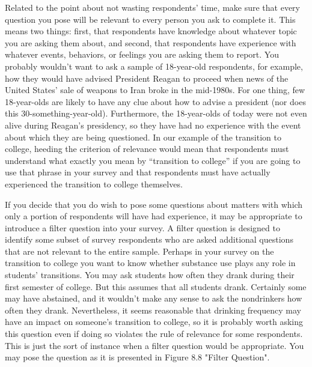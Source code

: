 Related to the point about not wasting respondents’ time, make sure that every question you pose will be relevant to every person you ask to complete it. This means two things: first, that respondents have knowledge about whatever topic you are asking them about, and second, that respondents have experience with whatever events, behaviors, or feelings you are asking them to report. You probably wouldn’t want to ask a sample of 18-year-old respondents, for example, how they would have advised President Reagan to proceed when news of the United States’ sale of weapons to Iran broke in the mid-1980s. For one thing, few 18-year-olds are likely to have any clue about how to advise a president (nor does this 30-something-year-old). Furthermore, the 18-year-olds of today were not even alive during Reagan’s presidency, so they have had no experience with the event about which they are being questioned. In our example of the transition to college, heeding the criterion of relevance would mean that respondents must understand what exactly you mean by “transition to college” if you are going to use that phrase in your survey and that respondents must have actually experienced the transition to college themselves.

If you decide that you do wish to pose some questions about matters with which only a portion of respondents will have had experience, it may be appropriate to introduce a filter question into your survey. A filter question is designed to identify some subset of survey respondents who are asked additional questions that are not relevant to the entire sample. Perhaps in your survey on the transition to college you want to know whether substance use plays any role in students’ transitions. You may ask students how often they drank during their first semester of college. But this assumes that all students drank. Certainly some may have abstained, and it wouldn’t make any sense to ask the nondrinkers how often they drank. Nevertheless, it seems reasonable that drinking frequency may have an impact on someone’s transition to college, so it is probably worth asking this question even if doing so violates the rule of relevance for some respondents. This is just the sort of instance when a filter question would be appropriate. You may pose the question as it is presented in Figure 8.8 "Filter Question".

